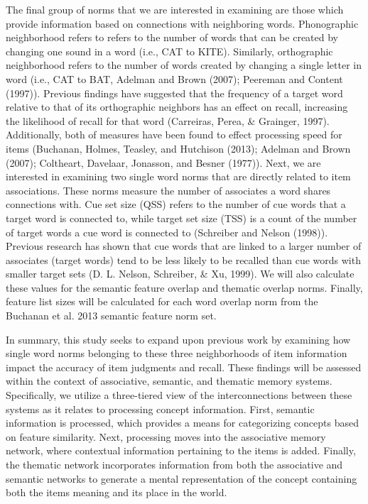 \documentclass[english,man]{apa6}
\theoremstyle{definition}
\theoremstyle{definition}
\theoremstyle{remark}
\begin{document}
The final group of norms that we are interested in examining are those
which provide information based on connections with neighboring words.
Phonographic neighborhood refers to refers to the number of words that
can be created by changing one sound in a word (i.e., CAT to KITE).
Similarly, orthographic neighborhood refers to the number of words
created by changing a single letter in word (i.e., CAT to BAT, Adelman
and Brown (2007); Peereman and Content (1997)). Previous findings have
suggested that the frequency of a target word relative to that of its
orthographic neighbors has an effect on recall, increasing the
likelihood of recall for that word (Carreiras, Perea, \& Grainger,
1997). Additionally, both of measures have been found to effect
processing speed for items (Buchanan, Holmes, Teasley, and Hutchison
(2013); Adelman and Brown (2007); Coltheart, Davelaar, Jonasson, and
Besner (1977)). Next, we are interested in examining two single word
norms that are directly related to item associations. These norms
measure the number of associates a word shares connections with. Cue set
size (QSS) refers to the number of cue words that a target word is
connected to, while target set size (TSS) is a count of the number of
target words a cue word is connected to (Schreiber and Nelson (1998)).
Previous research has shown that cue words that are linked to a larger
number of associates (target words) tend to be less likely to be
recalled than cue words with smaller target sets (D. L. Nelson,
Schreiber, \& Xu, 1999). We will also calculate these values for the
semantic feature overlap and thematic overlap norms. Finally, feature
list sizes will be calculated for each word overlap norm from the
Buchanan et al. 2013 semantic feature norm set.

In summary, this study seeks to expand upon previous work by examining
how single word norms belonging to these three neighborhoods of item
information impact the accuracy of item judgments and recall. These
findings will be assessed within the context of associative, semantic,
and thematic memory systems. Specifically, we utilize a three-tiered
view of the interconnections between these systems as it relates to
processing concept information. First, semantic information is
processed, which provides a means for categorizing concepts based on
feature similarity. Next, processing moves into the associative memory
network, where contextual information pertaining to the items is added.
Finally, the thematic network incorporates information from both the
associative and semantic networks to generate a mental representation of
the concept containing both the items meaning and its place in the
world.
\end{document}
